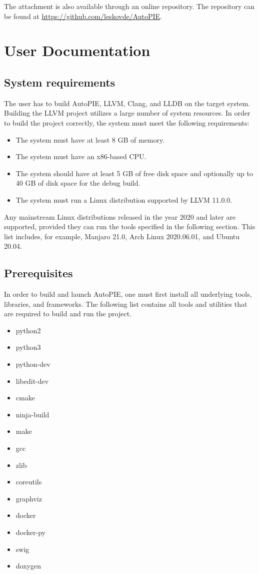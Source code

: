 \documentclass[12pt,a4paper]{report}
\begin{document}
\bigskip

The attachment is also available through an online repository. 
The repository can be found at \url{https://github.com/leskovde/AutoPIE}.

\section{User Documentation}\label{chap:userdoc}

\subsection{System requirements}

The user has to build AutoPIE, LLVM, Clang, and LLDB on the target system. 
Building the LLVM project utilizes a large number of system resources.  
In order to build the project correctly, the system must meet the following 
requirements:
\begin{itemize}
  \item The system must have at least 8 GB of memory.
  \item The system must have an x86-based CPU.
  \item The system should have at least 5 GB of free disk space and 
  optionally up to 40 GB of disk space for the debug build.
  \item The system must run a Linux distribution supported by LLVM 11.0.0.
\end{itemize}

Any mainstream Linux distributions released in the year 2020 and later are 
supported, provided they can run the tools specified in the following 
section. 
This list includes, for example, Manjaro 21.0, Arch Linux 2020.06.01, and 
Ubuntu 20.04.

\subsection{Prerequisites}

In order to build and launch AutoPIE, one must first install all underlying 
tools, libraries, and frameworks. 
The following list contains all tools and utilities that are required to 
build and run the project.

\begin{itemize}
  \item python2
  \item python3
  \item python-dev
  \item libedit-dev
  \item cmake
  \item ninja-build
  \item make
  \item gcc
  \item zlib
  \item coreutils
  \item graphviz
  \item docker
  \item docker-py
  \item swig
  \item doxygen
\end{itemize}
\end{document}
